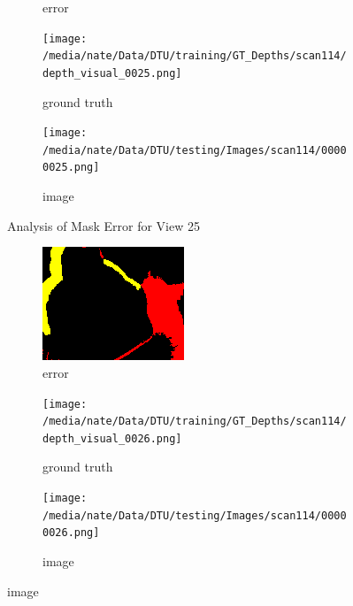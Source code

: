 \documentclass{article}
\begin{document}
\begin{figure}
\begin{subfigure}{0.3\textwidth}
		\caption{error}
		\label{fig:error25}
	\end{subfigure}
	\hfill
	\centering
	\begin{subfigure}{0.3\textwidth}
		\centering
		\texttt{[image: /media/nate/Data/DTU/training/GT\_Depths/scan114/depth\_visual\_0025.png]}
		\caption{ground truth}
		\label{fig:gt25}
	\end{subfigure}
	\hfill
	\centering
	\begin{subfigure}{0.3\textwidth}
		\centering
		\texttt{[image: /media/nate/Data/DTU/testing/Images/scan114/00000025.png]}
		\caption{image}
		\label{fig:img25}
	\end{subfigure}
	\hfill
	\caption{Analysis of Mask Error for View 25}
	\label{fig:error_analys25}
\end{figure}\begin{figure}
	\centering
	\begin{subfigure}{0.3\textwidth}
		\centering
		\includegraphics[width=\textwidth]{./output/026_error.png}
		\caption{error}
		\label{fig:error26}
	\end{subfigure}
	\hfill
	\centering
	\begin{subfigure}{0.3\textwidth}
		\centering
		\texttt{[image: /media/nate/Data/DTU/training/GT\_Depths/scan114/depth\_visual\_0026.png]}
		\caption{ground truth}
		\label{fig:gt26}
	\end{subfigure}
	\hfill
	\centering
	\begin{subfigure}{0.3\textwidth}
		\centering
		\texttt{[image: /media/nate/Data/DTU/testing/Images/scan114/00000026.png]}
		\caption{image}

\end{subfigure}
\end{figure}
\end{document}
